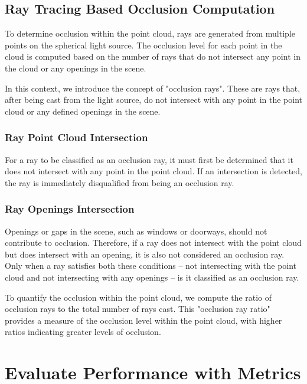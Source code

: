 \documentclass[11pt, a4paper,oneside,chapterprefix=false]{scrbook}
\begin{document}
\subsection{Ray Tracing Based Occlusion Computation}

To determine occlusion within the point cloud, rays are generated from multiple points on the spherical light source. The occlusion level for each point in the cloud is computed based on the number of rays that do not intersect any point in the cloud or any openings in the scene.

In this context, we introduce the concept of "occlusion rays". These are rays that, after being cast from the light source, do not intersect with any point in the point cloud or any defined openings in the scene.

\subsubsection{Ray Point Cloud Intersection}

For a ray to be classified as an occlusion ray, it must first be determined that it does not intersect with any point in the point cloud. If an intersection is detected, the ray is immediately disqualified from being an occlusion ray.

\subsubsection{Ray Openings Intersection}

Openings or gaps in the scene, such as windows or doorways, should not contribute to occlusion. Therefore, if a ray does not intersect with the point cloud but does intersect with an opening, it is also not considered an occlusion ray. Only when a ray satisfies both these conditions – not intersecting with the point cloud and not intersecting with any openings – is it classified as an occlusion ray.

To quantify the occlusion within the point cloud, we compute the ratio of occlusion rays to the total number of rays cast. This "occlusion ray ratio" provides a measure of the occlusion level within the point cloud, with higher ratios indicating greater levels of occlusion.


\section{Evaluate Performance with Metrics}
\end{document}
